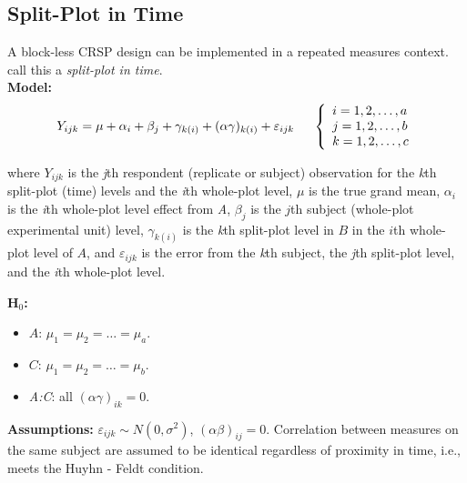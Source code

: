 \documentclass[12pt,english]{article}\usepackage[]{graphicx}\usepackage[table]{xcolor}
\begin{document}
\subsection{Split-Plot in Time}
A block-less CRSP design can be implemented in a repeated measures context.  \citet[][pg. 502]{milliken} call this a \textit{split-plot in time}. \\

\noindent\textbf{Model:} \[Y_{ijk} = \mu + \alpha_i + \beta_{j} + \gamma_{k(i)} + (\alpha\gamma)_{k(i)} + \varepsilon_{ijk} \hspace{0.2in} \left\{
                \begin{array}{ll}
                  i = 1,2,\dots,a\\
                  j = 1,2,\dots,b\\
                  k = 1,2,\dots,c
                \end{array}
              \right.\]

\noindent where $Y_{ijk}$ is the \textit{j}th respondent (replicate or subject) observation for the \textit{k}th split-plot (time) levels and the \textit{i}th whole-plot level, $\mu$ is the true grand mean, $\alpha_i$ is the \textit{i}th whole-plot level effect from \textit{A}, $\beta_{j}$ is the $j$th subject (whole-plot experimental unit) level, $\gamma_{k(i)}$ is the \textit{k}th split-plot level in $B$ in the $i$th whole-plot level of $A$, and $\varepsilon_{ijk}$ is the error from the \textit{k}th subject, the \textit{j}th split-plot level, and the \textit{i}th whole-plot level. \\
\vspace{0.05in}

\noindent \textbf{H$_0$:}
\begin{itemize}
\item $A$: $\mu_1 = \mu_2 = \dots = \mu_a$.
\item $C$: $\mu_1 = \mu_2 = \dots = \mu_b$.
\item \textit{A:C}: all $(\alpha\gamma)_{ik} = 0$.
\end{itemize}
\vspace{0.1in}

\noindent \textbf{Assumptions:} $\varepsilon_{ijk} \sim N(0, \sigma^2)$, \hspace{0.1in}  $(\alpha\beta)_{ij} = 0$.  Correlation between measures on the same subject are assumed to be identical regardless of proximity in time, i.e., meets the Huyhn - Feldt condition.
\vspace{0.1in}
\end{document}
